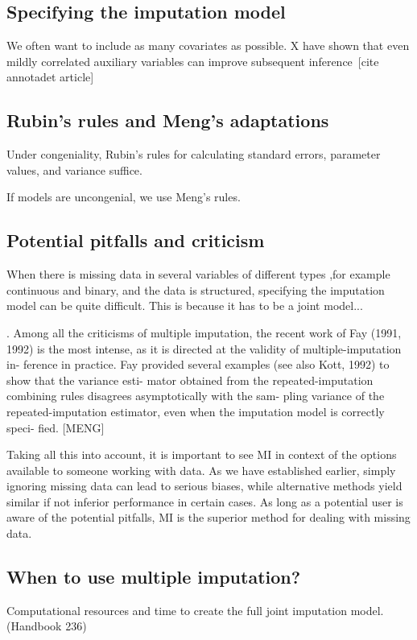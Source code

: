 \documentclass{article}
\begin{document}
	\subsection{Specifying the imputation model}
	
	We often want to include as many covariates as possible. X have shown that even mildly correlated auxiliary variables can improve subsequent inference [cite annotadet article]
	
	\subsection{Rubin's rules and Meng's adaptations}
	
	Under congeniality, Rubin's rules for calculating standard errors, parameter values, and variance suffice.
	
	If models are uncongenial, we use Meng's rules.
	
	\subsection{Potential pitfalls and criticism}
	When there is missing data in several variables of different types ,for example continuous and binary, and the data is structured, specifying the imputation model can be quite difficult. This is because it has to be a joint model...
	
	
	. Among all the
	criticisms of multiple imputation, the recent work
	of Fay (1991, 1992) is the most intense, as it is
	directed at the validity of multiple-imputation in-
	ference in practice. Fay provided several examples
	(see also Kott, 1992) to show that the variance esti-
	mator obtained from the repeated-imputation combining rules disagrees asymptotically with the sam-
	pling variance of the repeated-imputation estimator,
	even when the imputation model is correctly speci-
	fied. [MENG]
	
	
	Taking all this into account, it is important to see MI in context of the options available to someone working with data. As we have established earlier, simply ignoring missing data can lead  to serious biases, while alternative methods yield similar if not inferior performance in certain cases. As long as a potential user is aware of the potential pitfalls, MI is the superior method for dealing with missing data.
	
	
	\subsection{When to use multiple imputation?}
	Computational resources and time to create the full joint imputation model. (Handbook 236)
	
\end{document}

